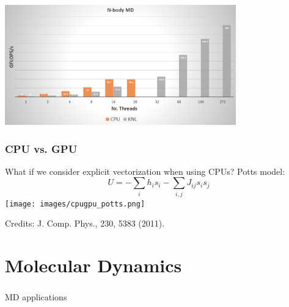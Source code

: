 \begin{frame}
	\frametitle{}
\includegraphics[width=10cm]{images/N-body.png}
\end{frame}

\begin{frame}
	\frametitle{CPU vs. GPU }

What if we consider explicit vectorization when using CPUs?
Potts model:
\begin{equation}
U = -\sum_i h_i s_i -\sum_{i,j} J_{ij}s_i s_j
\end{equation}
\texttt{[image: images/cpugpu\_potts.png]}

{\tiny
Credits: J. Comp. Phys., 230, 5383 (2011).
}
\end{frame}




\section{Molecular Dynamics}
\begin{frame}
	\frametitle{}
\begin{center}
{\Huge MD applications}
\end{center}
\end{frame}

